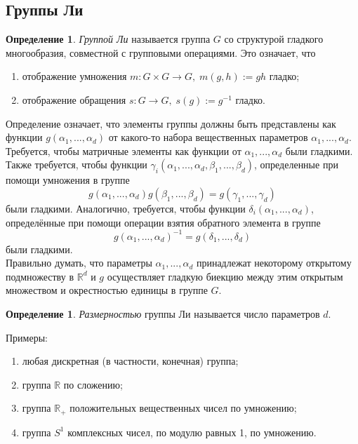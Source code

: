 \documentclass[12pt]{article}
\theoremstyle{definition}
\newtheorem{defin}[theorem]{Определение}
\begin{document}
\subsection{Группы Ли}
\begin{defin}
\textit{Группой Ли} называется группа $G$ со структурой гладкого многообразия,
совместной с групповыми операциями. Это означает, что
\begin{enumerate}
    \item отображение умножения $m: G \times G \rightarrow G, \;m(g, h) := gh$ гладко;
    \item отображение обращения $s : G \rightarrow G,\; s(g) := g^{-1}$ гладко.
\end{enumerate}
\end{defin}
Определение означает, что элементы группы должны быть представлены как функции $g(\alpha_1,...,\alpha_d)$ от какого-то набора вещественных параметров $\alpha_1,...,\alpha_d$. Требуется, чтобы матричные элементы как функции от $\alpha_1,...,\alpha_d$ были гладкими. Также требуется, чтобы функции $\gamma_i(\alpha_1,...,\alpha_d,\beta_1,...,\beta_d)$, определенные при помощи умножения в группе
\begin{equation}
    g(\alpha_1,...,\alpha_d)g(\beta_1,...,\beta_d)=g(\gamma_1,...,\gamma_d)
\end{equation}
были гладкими. Аналогично, требуется, чтобы функции $\delta_i(\alpha_1,...,\alpha_d)$, определённые при помощи операции взятия обратного элемента в группе
\begin{equation}
    g(\alpha_1,...,\alpha_d)^{-1}=g(\delta_1,...,\delta_d)
\end{equation}
были гладкими.\\
Правильно думать, что параметры $\alpha_1,...,\alpha_d$ принадлежат некоторому открытому подмножеству в $\mathbb{R}^d$ и $g$ осуществляет гладкую биекцию между этим открытым множеством и окрестностью единицы в группе $G$.
\begin{defin}
\textit{Размерностью} группы Ли называется число параметров $d$.
\end{defin}
Примеры:
\begin{enumerate}
    \item любая дискретная (в частности, конечная) группа;
    \item группа $\mathbb{R}$ по сложению;
    \item группа $\mathbb{R}_+$ положительных вещественных чисел по умножению;
    \item группа $S^1$ комплексных чисел, по модулю равных 1, по умножению.
\end{enumerate}
\end{document}

